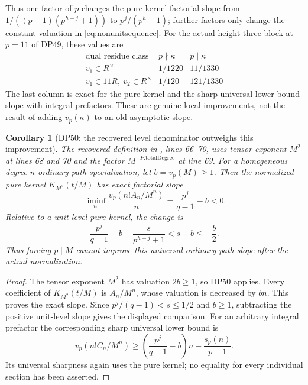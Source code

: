 \documentclass[11pt,a4paper]{article}
\newtheorem{corollary}[theorem]{Corollary}
\theoremstyle{definition}\newtheorem{remark}[theorem]{Remark}
\newcommand{\vp}{v_p}\newcommand{\dR}{\mathrm{dR}}\newcommand{\crys}{\mathrm{crys}}
\begin{document}
Thus one factor of $p$ changes the pure-kernel factorial slope from
$1/((p-1)(p^{h-j}+1))$ to $p^j/(p^h-1)$; further factors only change the constant valuation in \eqref{eq:nonunitsequence}.
For the actual height-three block at $p=11$ of DP49, these values are
\[
\begin{array}{c|c|c}
\text{dual residue class}&p\nmid\kappa&p\mid\kappa\\\hline
v_1\in R^\times&1/1220&11/1330\\
v_1\in11R,\ v_2\in R^\times&1/120&121/1330
\end{array}
\]
The last column is exact for the pure kernel and the sharp universal lower-bound slope with integral prefactors. These are genuine local improvements, not the result of adding $\vp(\kappa)$ to an old asymptotic slope.

\begin{corollary}[DP50: the recovered level denominator outweighs this improvement]
The recovered definition  in
, lines 66--70, uses tensor exponent $M^2$ at lines 68 and 70 and the factor $M^{-P.\mathrm{totalDegree}}$ at line 69.
For a homogeneous degree-$n$ ordinary-path specialization, let $b=\vp(M)\ge1$.
Then the normalized pure kernel $K_{M^2}(t/M)$ has exact factorial slope
\[
 \liminf_n\frac{\vp(n!A_n/M^n)}n
       =\frac{p^j}{q-1}-b<0.
\]
Relative to a unit-level pure kernel, the change is
\[
 \frac{p^j}{q-1}-b-\frac{s}{p^{h-j}+1}
       <s-b\le-\frac b2.
\]
Thus forcing $p\mid M$ cannot improve this universal ordinary-path slope after the actual normalization.
\end{corollary}

\begin{proof}
The tensor exponent $M^2$ has valuation $2b\ge1$, so DP50 applies.
Every coefficient of $K_{M^2}(t/M)$ is $A_n/M^n$, whose valuation is decreased by $bn$.
This proves the exact slope.
Since $p^j/(q-1)<s\le1/2$ and $b\ge1$, subtracting the positive unit-level slope gives the displayed comparison.
For an arbitrary integral prefactor the corresponding sharp universal lower bound is
\[
 \vp(n!C_n/M^n)
       \ge\left(\frac{p^j}{q-1}-b\right)n
           -\frac{s_p(n)}{p-1}.
\]
Its universal sharpness again uses the pure kernel; no equality for every individual section has been asserted.
\end{proof}
\end{document}
